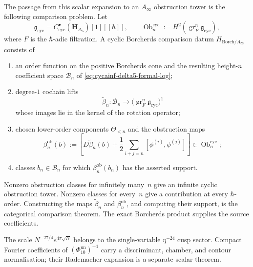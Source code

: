 \begin{remark}
The passage from this scalar expansion to an $A_\infty$ obstruction
tower is the following comparison problem.  Let
\[
 \mathfrak g_{\mathrm{cyc}}
 =C^\bullet_{\mathrm{cyc}}(\mathbf H_{\Delta_5})[1][[\hbar]],
 \qquad
 \operatorname{Ob}^{\mathrm{cyc}}_n
 :=H^2\!\left(\operatorname{gr}_F^n\mathfrak g_{\mathrm{cyc}}\right),
\]
where $F$ is the $\hbar$-adic filtration.  A cyclic Borcherds
comparison datum $H_{\mathrm{Borch}/A_\infty}$ consists of
\begin{enumerate}[label=\textup{(\roman*)}]
\item an order function on the positive Borcherds cone and the
resulting height-$n$ coefficient space $\mathscr B_n$ of
\eqref{eq:cycainf-delta5-formal-log};
\item degree-$1$ cochain lifts
\[
 \widetilde\beta_n\colon\mathscr B_n\longrightarrow
 \bigl(\operatorname{gr}_F^n\mathfrak g_{\mathrm{cyc}}\bigr)^1
\]
whose images lie in the kernel of the rotation operator;
\item chosen lower-order components $\Theta_{<n}$ and the obstruction
maps
\[
 \beta_n^{\mathrm{ob}}(b)
 :=\left[
 D\widetilde\beta_n(b)
 +\frac12\!\sum_{i+j=n}[\phi^{(i)},\phi^{(j)}]
 \right]
 \in\operatorname{Ob}^{\mathrm{cyc}}_n;
\]
\item classes $b_n\in\mathscr B_n$ for which
$\beta_n^{\mathrm{ob}}(b_n)$ has the asserted support.
\end{enumerate}
Nonzero obstruction classes for infinitely many~$n$ give an infinite
cyclic obstruction tower.  Nonzero classes for every~$n$ give a
contribution at every $\hbar$-order.  Constructing the maps
$\widetilde\beta_n$ and $\beta_n^{\mathrm{ob}}$, and computing their
support, is the categorical comparison theorem.  The exact
Borcherds product supplies the source coefficients.

The scale $N^{-27/4}e^{4\pi\sqrt N}$ belongs to the
single-variable $\eta^{-24}$ cusp sector.  Compact Fourier
coefficients of $(\Phi_{10}^{\mathrm{un}})^{-1}$ carry a
discriminant, chamber, and contour normalisation; their Rademacher
expansion is a separate scalar theorem.
\end{remark}

